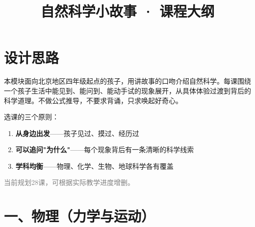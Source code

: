 \documentclass[a4paper,12pt]{ctexart}
\title{\textcolor{blue!70!black}{\Huge\textbf{自然科学小故事 · 课程大纲}}}
\author{}
\date{}
\begin{document}
\maketitle
\thispagestyle{empty}

\section*{\textcolor{blue!70!black}{设计思路}}

本模块面向北京地区四年级起点的孩子，用讲故事的口吻介绍自然科学。每课围绕一个孩子生活中能见到、能问到、能动手试的现象展开，从具体体验过渡到背后的科学道理。不做公式推导，不要求背诵，只求唤起好奇心。

选课的三个原则：
\begin{enumerate}
  \item \textbf{从身边出发}——孩子见过、摸过、经历过
  \item \textbf{可以追问"为什么"}——每个现象背后有一条清晰的科学线索
  \item \textbf{学科均衡}——物理、化学、生物、地球科学各有覆盖
\end{enumerate}

\vspace{0.3cm}
\textcolor{gray}{\small 当前规划28课，可根据实际教学进度增删。}

\newpage

\section*{\textcolor{orange!80!black}{一、物理（力学与运动）}}
\end{document}
